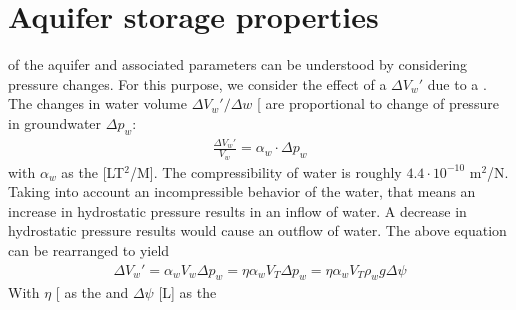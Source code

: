 \documentclass[letterpaper,10pt,english]{jupyterBook}
\begin{document}
\section{Aquifer storage properties}
\label{\detokenize{content/flow/L3/13_gw_storage:aquifer-storage-properties}}
\sphinxAtStartPar
{} of the aquifer and associated parameters can be understood by considering pressure changes. For this purpose, we consider the effect of a  \(\Delta V_w'\) due to a . The  changes in water volume \(\Delta V_w'/\Delta w\) {[}\sphinxhyphen{}{]} are proportional to change of pressure in groundwater \(\Delta p_w\):
\begin{equation*}
\begin{split}
\frac{\Delta V_w'}{V_w} = \alpha_w \cdot \Delta p_w
\end{split}
\end{equation*}
\sphinxAtStartPar
with \(\alpha_w\) as the  {[}LT\(^2\)/M{]}. The compressibility of water is roughly \(4.4 \cdot 10^{-10}\) m\(^2\)/N. Taking into account an incompressible behavior of the water, that means an increase in hydrostatic pressure results in an inflow of water. A decrease in hydrostatic pressure results would cause an outflow of water. The above equation can be rearranged to yield
\begin{equation*}
\begin{split}
\Delta V_w' = \alpha_w V_w \Delta p_w = \eta \alpha_w V_T \Delta p_w = \eta \alpha_w V_T \rho_w g \Delta \psi
\end{split}
\end{equation*}
\sphinxAtStartPar
With \(\eta\) {[}\sphinxhyphen{}{]} as the  and \(\Delta \psi\) {[}L{]} as the 
\end{document}
